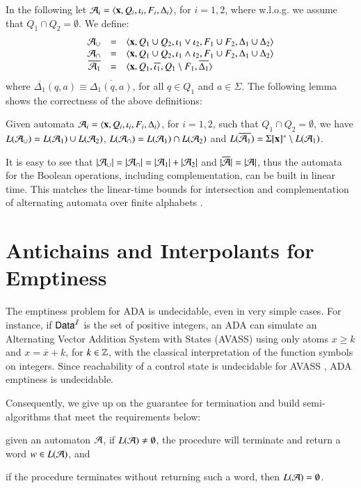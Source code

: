 \documentclass[10pt]{llncs}
\begin{document}
In the following let $\mathcal{A}_i =
\left\langle \mathbf x,Q_i,\iota_i,F_i,\Delta_i \right\rangle$, for $i=1,2$, where
w.l.o.g. we assume that $Q_1 \cap Q_2 = \emptyset$. We define:
\[\begin{array}{rcl}
\mathcal{A}_\cup & = & \left\langle \mathbf x,Q_1\cup Q_2,\iota_1 \vee \iota_2,F_1\cup F_2,\Delta_1\cup\Delta_2 \right\rangle \\ 
\mathcal{A}_\cap & = & \left\langle \mathbf x,Q_1\cup Q_2,\iota_1 \wedge \iota_2, F_1\cup F_2, \Delta_1\cup\Delta_2 \right\rangle \\ 
\overline{\mathcal{A}_1} & = & \langle \mathbf x,Q_1,\overline{\iota_1},Q_1\setminus F_1,\overline{\Delta_1} \rangle
\end{array}\] 
where $\overline{\Delta_1}(q,a) \equiv \overline{\Delta_1(q,a)}$, for
all $q \in Q_1$ and $a \in \Sigma$. The following lemma shows the
correctness of the above definitions:

\begin{lemma}\label{lemma:closure}
  Given automata $\mathcal{A}_i = \left\langle \mathbf x,Q_i,\iota_i,F_i,\Delta_i \right\rangle$,
  for $i=1,2$, such that $Q_1 \cap Q_2 = \emptyset$, we have
  $L(\mathcal{A}_\cup) = L(\mathcal{A}_1) \cup L(\mathcal{A}_2)$, $L(\mathcal{A}_\cap) = L(\mathcal{A}_1) \cap
  L(\mathcal{A}_2)$ and $L(\overline{\mathcal{A}_1}) = \Sigma[\mathbf x]^* \setminus
  L(\mathcal{A}_1)$.
\end{lemma}

It is easy to see that ${|{\mathcal{A}_\cup}|} = {|{\mathcal{A}_\cap}|} = {|{\mathcal{A}_1}|} +
{|{\mathcal{A}_2}|}$ and ${|{\overline{\mathcal{A}}}|} = {|{\mathcal{A}}|}$, thus the automata
for the Boolean operations, including complementation, can be built in
linear time. This matches the linear-time bounds for intersection and
complementation of alternating automata over finite alphabets
\cite{ChandraKozenStockmeyer81}.

\section{Antichains and Interpolants for Emptiness}

The emptiness problem for ADA is undecidable, even in very simple
cases. For instance, if $\mathsf{Data}^{\mathcal{I}}$ is the set of positive integers, an
ADA can simulate an Alternating Vector Addition System with States
(AVASS) using only atoms $x \geq k$ and $x = \overline{x} + k$, for $k
\in {\bf \mathbb{Z}}$, with the classical interpretation of the function symbols
on integers. Since reachability of a control state is undecidable for
AVASS \cite{LINCOLN92}, ADA emptiness is undecidable.

Consequently, we give up on the guarantee for termination and build
semi-algorithms that meet the requirements below: \begin{compactenum}[(i)]
\item given an automaton $\mathcal{A}$, if $L(\mathcal{A}) \neq\emptyset$, the procedure
  will terminate and return a word $w \in L(\mathcal{A})$, and
%
\item if the procedure terminates without returning such a word, then
  $L(\mathcal{A}) = \emptyset$.
\end{compactenum}
\end{document}
